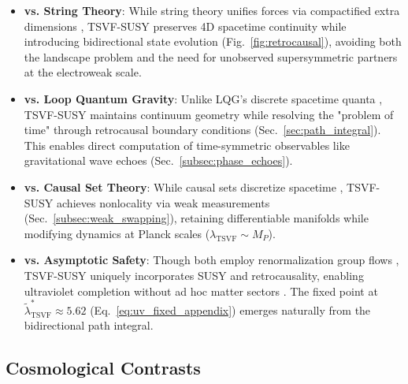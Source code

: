 \documentclass[twocolumn,superscriptaddress,floatfix]{revtex4-2}
\begin{document}
\begin{itemize}
\item \textbf{vs. String Theory}: While string theory unifies forces via compactified extra dimensions \cite{Polchinski1998}, TSVF-SUSY preserves 4D spacetime continuity while introducing bidirectional state evolution (Fig.~\ref{fig:retrocausal}), avoiding both the landscape problem \cite{Susskind2003} and the need for unobserved supersymmetric partners at the electroweak scale.

\item \textbf{vs. Loop Quantum Gravity}: Unlike LQG's discrete spacetime quanta \cite{Rovelli2004}, TSVF-SUSY maintains continuum geometry while resolving the "problem of time" \cite{Kuchar2011} through retrocausal boundary conditions (Sec.~\ref{sec:path_integral}). This enables direct computation of time-symmetric observables like gravitational wave echoes (Sec.~\ref{subsec:phase_echoes}).

\item \textbf{vs. Causal Set Theory}: While causal sets discretize spacetime \cite{Sorkin2003}, TSVF-SUSY achieves nonlocality via weak measurements (Sec.~\ref{subsec:weak_swapping}), retaining differentiable manifolds while modifying dynamics at Planck scales ($\lambda_{\text{TSVF}} \sim M_P$).

\item \textbf{vs. Asymptotic Safety}: Though both employ renormalization group flows \cite{Reuter1998}, TSVF-SUSY uniquely incorporates SUSY and retrocausality, enabling ultraviolet completion without ad hoc matter sectors \cite{Niedermaier2006}. The fixed point at $\tilde{\lambda}_{\text{TSVF}}^* \approx 5.62$ (Eq.~\ref{eq:uv_fixed_appendix}) emerges naturally from the bidirectional path integral.
\end{itemize}

\subsection{Cosmological Contrasts}
\label{subsec:cosmo_comparison}
\end{document}
